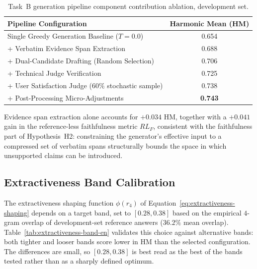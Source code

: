 \begin{table}[h]
\centering
\small
\begin{tabular}{lc}
\toprule
\textbf{Pipeline Configuration} & \textbf{Harmonic Mean (HM)} \\
\midrule
Single Greedy Generation Baseline ($T{=}0.0$) & 0.654 \\
+ Verbatim Evidence Span Extraction & 0.688 \\
+ Dual-Candidate Drafting (Random Selection) & 0.706 \\
+ Technical Judge Verification & 0.725 \\
+ User Satisfaction Judge ($60\%$ stochastic sample) & 0.738 \\
+ Post-Processing Micro-Adjustments & \textbf{0.743} \\
\bottomrule
\end{tabular}
\caption{Task~B generation pipeline component contribution ablation, development set.}
\label{tab:gen-ablation-en}
\end{table}

Evidence span extraction alone accounts for $+0.034$ HM, together with a $+0.041$ gain in the reference-less faithfulness metric $RL_F$, consistent with the faithfulness part of Hypothesis~H2: constraining the generator's effective input to a compressed set of verbatim spans structurally bounds the space in which unsupported claims can be introduced.

\subsection{Extractiveness Band Calibration}

The extractiveness shaping function $\phi(r_4)$ of Equation~\eqref{eq:extractiveness-shaping} depends on a target band, set to $[0.28, 0.38]$ based on the empirical $4$-gram overlap of development-set reference answers ($36.2\%$ mean overlap). Table~\ref{tab:extractiveness-band-en} validates this choice against alternative bands: both tighter and looser bands score lower in HM than the selected configuration. The differences are small, so $[0.28, 0.38]$ is best read as the best of the bands tested rather than as a sharply defined optimum.

